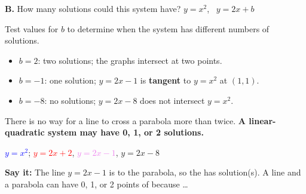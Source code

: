 \begin{minipage}[t]{0.63\textwidth}
\vspace{0pt}\raggedright
\textbf{B.} How many solutions could this system have? \quad $y=x^2$, \ $y=2x+b$

Test values for $b$ to determine when the system has different numbers of solutions.
\begin{itemize}[itemsep=0pt]
\item $b=2$: two solutions; the graphs intersect at two points.
\item $b=-1$: one solution; $y=2x-1$ is \textbf{tangent} to $y=x^2$ at $(1,1)$.
\item $b=-8$: no solutions; $y=2x-8$ does not intersect $y=x^2$.
\end{itemize}
There is no way for a line to cross a parabola more than twice. \textbf{A linear-quadratic system may have 0, 1, or 2 solutions.}
\end{minipage}\hfill
\begin{minipage}[t]{0.35\textwidth}
\vspace{0pt}
\begin{center}

{\scriptsize \textcolor{blue}{$y=x^2$}; \textcolor{red}{$y=2x+2$}, \textcolor{violet}{$y=2x-1$}, \textcolor{green!40!black}{$y=2x-8$}}
\end{center}
\end{minipage}

\textbf{Say it:} The line $y=2x-1$ is \blank[2.4cm] to the parabola, so the \blank[2.2cm] has \blank[1.6cm] solution(s). A line and a parabola can have 0, 1, or 2 points of \blank[2.6cm] because \dots\lines[1]

